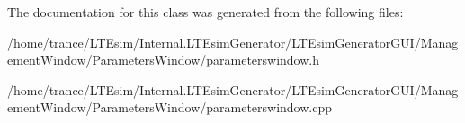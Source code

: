 The documentation for this class was generated from the following files\+:\begin{DoxyCompactItemize}
\item 
/home/trance/\+L\+T\+Esim/\+Internal.\+L\+T\+Esim\+Generator/\+L\+T\+Esim\+Generator\+G\+U\+I/\+Management\+Window/\+Parameters\+Window/parameterswindow.\+h\item 
/home/trance/\+L\+T\+Esim/\+Internal.\+L\+T\+Esim\+Generator/\+L\+T\+Esim\+Generator\+G\+U\+I/\+Management\+Window/\+Parameters\+Window/parameterswindow.\+cpp\end{DoxyCompactItemize}
